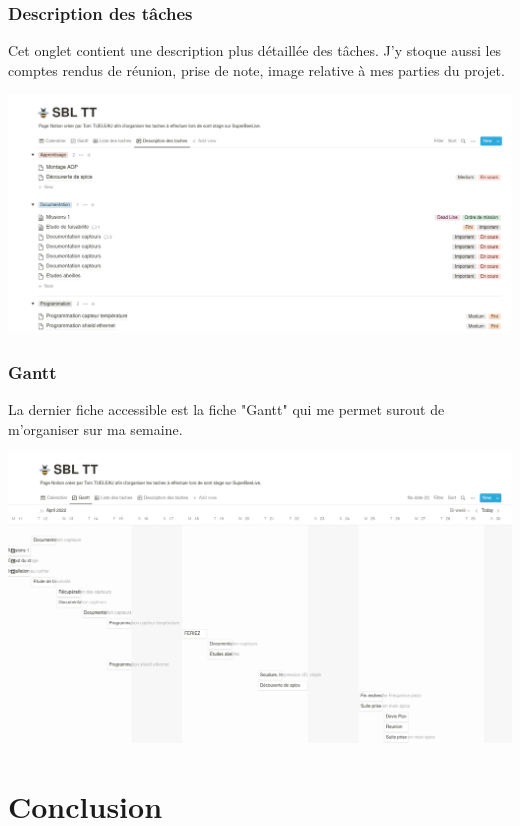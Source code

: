 \documentclass[11pt,french,a4paper]{article}
\begin{document}
\subsubsection{Description des tâches}
Cet onglet contient une description plus détaillée des tâches. J'y stoque aussi les comptes rendus de réunion, prise de note, image relative à mes parties du projet.
\begin{center}	
\includegraphics[scale=0.35]{../img/notiondescriptiondestaches.png}
\label{Description des taches}
\end{center}

\subsubsection{Gantt}
La dernier fiche accessible est la fiche "Gantt" qui me permet surout de m'organiser sur ma semaine. 
\begin{center}	
\includegraphics[scale=0.35]{../img/notiongantt.png}
\label{Gantt}
\end{center}
\newpage 
\section{Conclusion}
\end{document}

